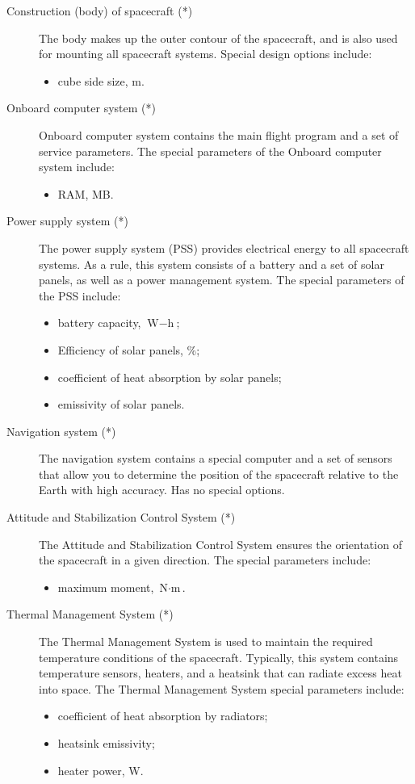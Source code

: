 \documentclass[12pt,a4paper]{article}
\begin{document}
\begin{description}
\item[Construction (body) of spacecraft (*)] The body makes up the outer contour of the spacecraft, and is also used for mounting all spacecraft systems. Special design options include:
   \begin{itemize}
     \item cube side size, m.
   \end{itemize}
\item[Onboard computer system (*)] Onboard computer system contains the main flight program and a set of service parameters. The special parameters of the Onboard computer system include:
   \begin{itemize}
     \item RAM, MB.
   \end{itemize}
\item [Power supply system (*)] The power supply system (PSS) provides electrical energy to all spacecraft systems. As a rule, this system consists of a battery and a set of solar panels, as well as a power management system. The special parameters of the PSS include:
   \begin{itemize}
   \item battery capacity, $\text{W} - \text{h}$;
   \item Efficiency of solar panels, \%;
   \item coefficient of heat absorption by solar panels;
   \item emissivity of solar panels.
   \end{itemize}

\item [Navigation system (*)] The navigation system contains a special computer and a set of sensors that allow you to determine the position of the spacecraft relative to the Earth with high accuracy. Has no special options.

\item [Attitude and Stabilization Control System (*)] The Attitude and Stabilization Control System ensures the orientation of the spacecraft in a given direction. The special parameters include:
   \begin{itemize}
     \item maximum moment, $\text{N} \cdot \text{m}$.
   \end{itemize}

\item [Thermal Management System (*)] The Thermal Management System is used to maintain the required temperature conditions of the spacecraft. Typically, this system contains temperature sensors, heaters, and a heatsink that can radiate excess heat into space. The Thermal Management System special parameters include:
   \begin{itemize}
   \item coefficient of heat absorption by radiators;
   \item heatsink emissivity;
   \item heater power, W.
   \end{itemize}


\end{description}
\end{document}
